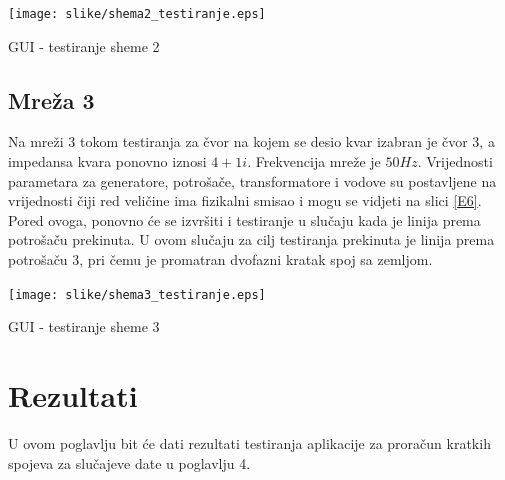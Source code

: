 \documentclass[a4paper, 12pt]{article}
\numberwithin{figure}{section}
\numberwithin{equation}{section}
\begin{document}
\begin{center}
    \captionsetup{type=figure}
    \begin{center}
        \texttt{[image: slike/shema2\_testiranje.eps]}
        \caption{GUI - testiranje sheme 2}
        \label{E5}
    \end{center}
\end{center}

\subsection{Mreža 3}

Na mreži 3 tokom testiranja za čvor na kojem se desio kvar izabran je čvor 3, a impedansa kvara ponovno iznosi $4+1i$. Frekvencija mreže je $50Hz$. Vrijednosti parametara za generatore, potrošače, transformatore i vodove su postavljene na vrijednosti čiji red veličine ima fizikalni smisao i mogu se vidjeti na slici \ref{E6}. Pored ovoga, ponovno će se izvršiti i testiranje u slučaju kada je linija prema potrošaču prekinuta. U ovom slučaju za cilj testiranja prekinuta je linija prema potrošaču 3, pri čemu je promatran dvofazni kratak spoj sa zemljom.

\begin{center}
    \captionsetup{type=figure}
    \begin{center}
        \texttt{[image: slike/shema3\_testiranje.eps]}
        \caption{GUI - testiranje sheme 3}
        \label{E6}
    \end{center}
\end{center}





























\newpage
\section{Rezultati}

U ovom poglavlju bit će dati rezultati testiranja aplikacije za proračun kratkih spojeva za slučajeve date u poglavlju 4.
\end{document}
